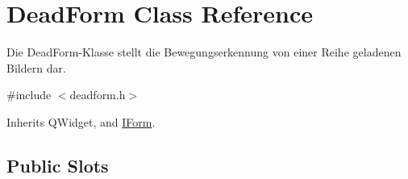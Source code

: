 \hypertarget{class_dead_form}{}\section{Dead\+Form Class Reference}
\label{class_dead_form}


Die Dead\+Form-\/\+Klasse stellt die Bewegungserkennung von einer Reihe geladenen Bildern dar.  




{\ttfamily \#include $<$deadform.\+h$>$}



Inherits Q\+Widget, and \hyperlink{class_i_form}{I\+Form}.

\subsection*{Public Slots}

